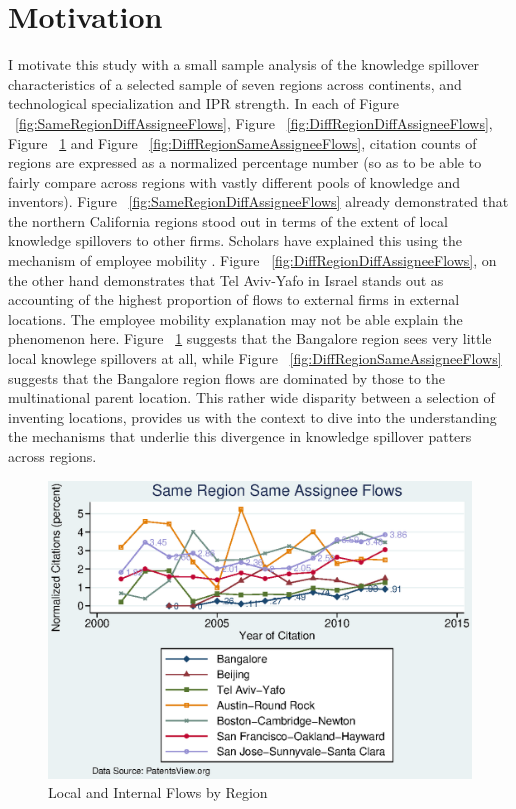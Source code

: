 \documentclass[12pt]{article}
\begin{document}
\section{Motivation}
I motivate this study with a small sample analysis of the knowledge spillover characteristics of a selected sample of seven regions across continents, and technological specialization and IPR strength. In each of Figure ~\ref{fig:SameRegionDiffAssigneeFlows}, Figure ~\ref{fig:DiffRegionDiffAssigneeFlows}, Figure ~\ref{fig:SameRegionSameAssigneeFlows} and Figure ~\ref{fig:DiffRegionSameAssigneeFlows}, citation counts of regions are expressed as a normalized percentage number (so as to be able to fairly compare across regions with vastly different pools of knowledge and inventors). Figure ~\ref{fig:SameRegionDiffAssigneeFlows}  already demonstrated that the northern California regions stood out in terms of the extent of local knowledge spillovers to other firms. Scholars have explained this using the mechanism of employee mobility \citep{Almeida1999}. Figure ~\ref{fig:DiffRegionDiffAssigneeFlows}, on the other hand demonstrates that Tel Aviv-Yafo in Israel stands out as accounting of the highest proportion of flows to external firms in external locations. The employee mobility explanation may not be able explain the phenomenon here. Figure ~\ref{fig:SameRegionSameAssigneeFlows} suggests that the Bangalore region sees very little local knowlege spillovers at all, while Figure ~\ref{fig:DiffRegionSameAssigneeFlows} suggests that the Bangalore region flows are dominated by those to the multinational parent location. This rather wide disparity between a selection of inventing locations, provides us with the context to dive into the understanding the mechanisms that underlie this divergence in knowledge spillover patters across regions.

\begin{figure}[h]
\begin{centering}
  \includegraphics[width=\textwidth]{SameRegionSameAssigneeFlows}
  \caption{Local and Internal Flows by Region}
  \label{fig:SameRegionSameAssigneeFlows}
\end{centering}
\end{figure}
\end{document}
